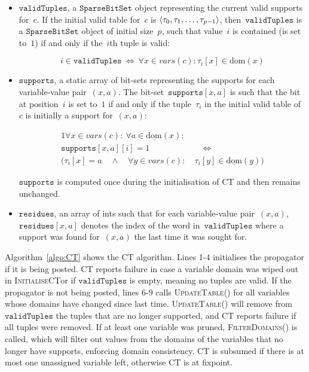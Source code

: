 \documentclass[a4paper,11pt]{article}
\newcommand{\Algoref}[1]{Algorithm~\ref{#1}}
\newcommand{\Dom}[1]{\text{dom}({#1})}
\newcommand{\Dominit}[1]{\underline{\text{dom}}(#1)}
\newcommand{\SparseBitSet}{\texttt{SparseBitSet}}
\newcommand{\Scp}{\texttt{vars}}
\newcommand{\CurrTable}{\texttt{validTuples}}
\newcommand{\Supports}{\texttt{supports}}
\newcommand{\Residues}{\texttt{residues}}
\def\UpdateTable{\textsc{UpdateTable}}
\def\FilterDomains{\textsc{FilterDomains}}
\def\InitialiseCT{\textsc{InitialiseCT}}
\numberwithin{equation}{section}
\begin{document}
\begin{itemize}
  
  \item $\CurrTable$, a $\SparseBitSet$ object representing the current valid
    supports for~$c$. If the initial valid table for~$c$
    is $\left\langle\tau_0, \tau_1, \ldots, \tau_{p-1}\right\rangle$,
    then~$\CurrTable$ is a 
    $\SparseBitSet$ object of initial size~$p$, such that value~$i$
    is contained (is set to~$1$) if and only if the~$i$th tuple is valid:
    
    \begin{equation} \label{eq:currtable}
      i \in \CurrTable \ \Leftrightarrow \ \forall x \in vars(c): \tau_i[x] \in \Dom{x}
    \end{equation}

  \item $\Supports$, a static array of bit-sets representing
    the supports for each variable-value pair~$(x,a)$.
    The bit-set~$\Supports[x,a]$ is such that
    the bit at position~$i$ is set to~$1$ if and only if the 
    tuple~$\tau_i$ in the initial valid table of~$c$ is initially a support for~$(x,a)$:

    \begin{alignat}{1}
      \forall x \in vars(c): \ \forall a \in \Dominit{x}:& \\
      \Supports[x,a][i] = 1 &\quad \Leftrightarrow \\
      (\tau_i[x] = a \quad \land \quad
      \forall y \in vars(c): \ &\tau_i[y] \in \Dominit{y})
    \end{alignat}

    $\Supports$ is computed once during the initialisation of CT and then
    remains unchanged.
    
  \item $\Residues$, an array of ints such that for each variable-value pair~$(x,a)$,
    $\Residues[x,a]$ denotes the index of the word in~$\CurrTable$ where a support
    was found for~$(x,a)$ the last time it was sought for.

\end{itemize}

\Algoref{algo:CT} shows the CT algorithm. Lines 1-4 initialises the propagator
if it is being posted. CT reports failure in case a variable domain was
wiped out in \InitialiseCT or if $\CurrTable$ is empty, meaning no tuples are valid.
If the propagator is not being posted,
lines 6-9 calls \UpdateTable() for all variables whose domains have changed
since last time. \UpdateTable() will remove from $\CurrTable$ the tuples that
are no longer supported, and CT reports failure if all tuples were removed.
If at least one variable was pruned, \FilterDomains() is
called, which will filter out values from the domains of the variables that
no longer have supports, enforcing domain consistency.
CT is subsumed if there is at most one unassigned variable
left, otherwise CT is at fixpoint.
\end{document}
